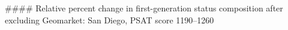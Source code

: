 #### Relative percent change in first-generation status composition after excluding Geomarket: San Diego, PSAT score 1190–1260
